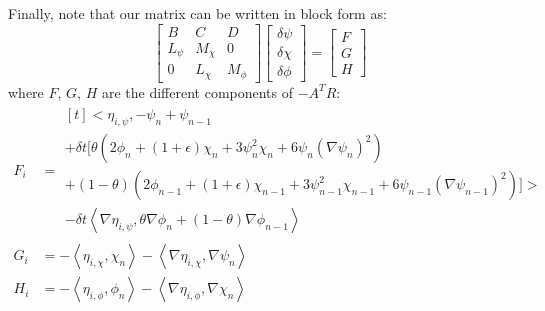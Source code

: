 \documentclass[reqno]{article}
\begin{document}
Finally, note that our matrix can be written in block form as:
\begin{equation}
    \begin{bmatrix}
        B &C &D \\
        L_{\psi} &M_{\chi} &0 \\
        0 &L_{\chi} &M_{\phi}
    \end{bmatrix}
    \begin{bmatrix}
        \delta \psi \\
        \delta \chi \\
        \delta \phi
    \end{bmatrix}
    =
    \begin{bmatrix}
        F \\
        G \\
        H
    \end{bmatrix}
\end{equation}
where $F$, $G$, $H$ are the different components of $-A^T R$:
\begin{equation}
    \begin{split}
        F_i
        &=
        \begin{multlined}[t]
            \biggl<\eta_{i, \psi}, 
            -\psi_n + \psi_{n - 1} \\
            + \delta t \biggl[ 
            \theta \left( 2 \phi_n + (1 + \epsilon) \chi_n + 3 \psi_n^2 \chi_n + 6 \psi_n \left(\nabla \psi_n \right)^2
            \right) \\
            + \left(1 - \theta \right) \left( 2 \phi_{n - 1} + (1 + \epsilon) \chi_{n - 1} + 3 \psi_{n - 1}^2 \chi_{n - 1} + 6 \psi_{n - 1} \left(\nabla \psi_{n - 1}\right)^2
            \right)
            \biggr]\biggr> \\
            - \delta t \left< \nabla \eta_{i, \psi}, \theta \nabla \phi_n + \left(1 - \theta\right) \nabla \phi_{n - 1} \right>
        \end{multlined}\\
        G_i
        &=
        - \left<\eta_{i, \chi}, \chi_n \right>
        - \left< \nabla \eta_{i, \chi}, \nabla \psi_n \right> \\
        H_i
        &=
        - \left< \eta_{i, \phi}, \phi_n \right>
        - \left<\nabla \eta_{i, \phi}, \nabla \chi_n \right>
    \end{split}
\end{equation}
\end{document}
